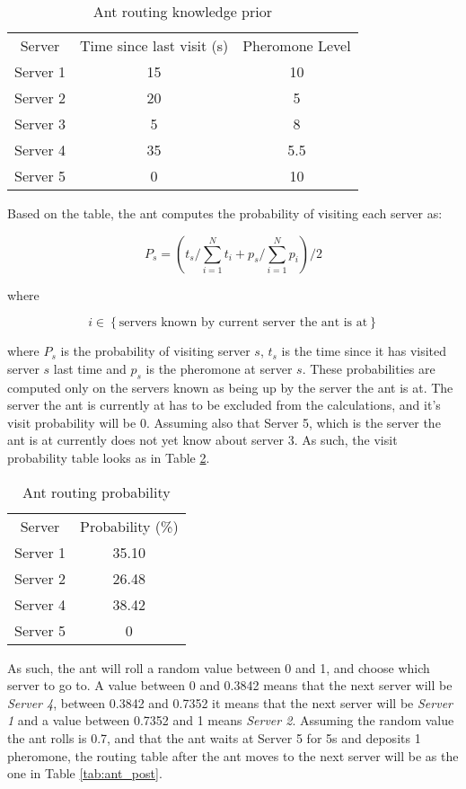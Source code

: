 \begin{table}
\centering
\begin{tabular}{c|c|c}
Server & Time since last visit (s) & Pheromone Level \\
Server 1 & 15 & 10 \\ 
Server 2 & 20 & 5 \\
Server 3 & 5 & 8 \\
Server 4 & 35 & 5.5 \\
Server 5 & 0 & 10 \\
\end{tabular}
\caption{Ant routing knowledge prior}
\label{tab:ant_prio}
\end{table}

Based on the table, the ant computes the probability of visiting each server as:

\begin{equation}
P_s = (t_s / \sum_{i=1}^{N} t_i + p_{s} / \sum_{i=1}^{N} p_i) / 2
\end{equation}

where

\begin{equation}
i \in \left\{\text{servers known by current server the ant is at} \right\}
\end{equation}

where $P_s$ is the probability of visiting server $s$, $t_s$ is the time since it has visited server $s$ last time and $p_{s}$ is the pheromone at server $s$. These probabilities are computed only on the servers known as being up by the server the ant is at. The server the ant is currently at has to be excluded from the calculations, and it's visit probability will be 0. Assuming also that Server 5, which is the server the ant is at currently does not yet know about server 3. As such, the visit probability table looks as in Table \ref{tab:ant_prob}.

\begin{table}
\centering
\begin{tabular}{c|c}
Server & Probability (\%) \\
Server 1 & 35.10 \\
Server 2 & 26.48 \\
Server 4 & 38.42 \\
Server 5 & 0 \\
\end{tabular}
\caption{Ant routing probability}
\label{tab:ant_prob}
\end{table}

As such, the ant will roll a random value between 0 and 1, and choose which server to go to. A value between 0 and 0.3842 means that the next server will be \textit{Server 4}, between 0.3842 and 0.7352 it means that the next server will be \textit{Server 1} and a value between 0.7352 and 1 means \textit{Server 2}. Assuming the random value the ant rolls is 0.7, and that the ant waits at Server 5 for 5s and deposits 1 pheromone, the routing table after the ant moves to the next server will be as the one in Table \ref{tab:ant_post}.

